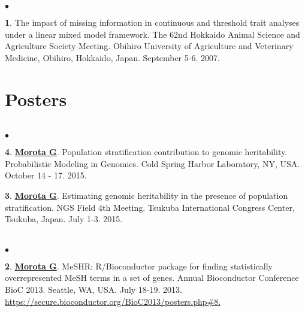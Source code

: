 \documentclass[margin,line,10pt]{res}
\newenvironment{list2}{
  \begin{list}{$\bullet$}{%
      \setlength{\itemsep}{0in}
      \setlength{\parsep}{0in} \setlength{\parskip}{0in}
      \setlength{\topsep}{0in} \setlength{\partopsep}{0in} 
      \setlength{\leftmargin}{0.2in}}}{\end{list}}
\begin{document}
\begin{resume}
\section{}
\begin{list2}
\item  [{\bf 1}.] The impact of missing information in continuous and threshold trait analyses under a linear mixed model framework. The 62nd Hokkaido Animal Science and Agriculture Society Meeting. Obihiro University of Agriculture and Veterinary Medicine, Obihiro, Hokkaido, Japan. September 5-6. 2007.
\end{list2}


\vspace{0.5cm}
\section{ \sc Posters }
\vspace{0.5cm}
\section{}
\begin{list2}

\item  [{\bf 4}.] \textbf{\underline{Morota G}}. Population stratification contribution to genomic heritability. Probabilistic Modeling in Genomics. Cold Spring Harbor Laboratory, NY, USA. October 14 - 17. 2015.

  \vspace{0.5cm}
  
\item  [{\bf 3}.] \textbf{\underline{Morota G}}.  Estimating genomic heritability in the presence of population stratification. NGS Field 4th Meeting. Tsukuba International Congress Center, Tsukuba, Japan. July 1-3. 2015.
\end{list2}

\section{}
\begin{list2}
\item   [{\bf 2}.]  \textbf{\underline{Morota G}}.  MeSHR: R/Bioconductor package for finding statistically overrepresented  MeSH terms in a set of genes. Annual Bioconductor Conference BioC 2013. Seattle, WA, USA. July 18-19. 2013. \\ \textcolor{blue}{\href{https://secure.bioconductor.org/BioC2013/posters.php\#7}{https://secure.bioconductor.org/BioC2013/posters.php\#8. } }  


\end{list2}
\end{resume}
\end{document}
